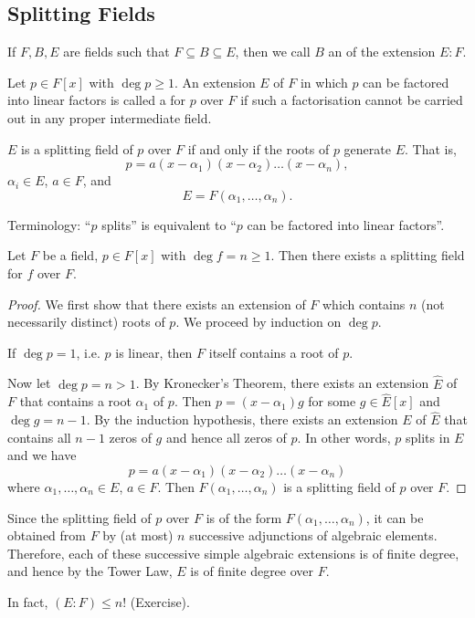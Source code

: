 \subsection{Splitting Fields}
If $F, B, E$ are fields such that $F \subseteq B \subseteq E$, then we call $B$ an  of the extension $E : F$.

\begin{definition}
	Let $p \in F[x]$ with $\deg{p} \geq 1$. An extension $E$ of $F$ in which $p$ can be factored into linear factors is called a  for $p$ over $F$ if such a factorisation cannot be carried out in any proper intermediate field.
\end{definition}

\begin{note}
	$E$ is a splitting field of $p$ over $F$ if and only if the roots of $p$ generate $E$. That is,
	\[
		p = a(x - \alpha_1)(x - \alpha_2)\dots(x - \alpha_n),
	\]
	$\alpha_i \in E$, $a \in F$, and
	\[
		E = F(\alpha_1, \dots, \alpha_n).
	\]
\end{note}

Terminology: ``$p$ splits'' is equivalent to ``$p$ can be factored into linear factors''.

\begin{theorem}\label{thm:9}
	Let $F$ be a field, $p \in F[x]$ with $\deg{f} = n \geq 1$. Then there exists a splitting field for $f$ over $F$.
	\begin{proof}
		We first show that there exists an extension of $F$ which contains $n$ (not necessarily distinct) roots of $p$. We proceed by induction on $\deg{p}$.
		
		If $\deg{p} = 1$, i.e. $p$ is linear, then $F$ itself contains a root of $p$.
		
		Now let $\deg{p} = n > 1$. By Kronecker's Theorem, there exists an extension $\hat{E}$ of $F$ that contains a root $\alpha_1$ of $p$. Then $p = (x - \alpha_1)g$ for some $g \in \hat{E}[x]$ and $\deg{g} = n - 1$. By the induction hypothesis, there exists an extension $E$ of $\hat{E}$ that contains all $n - 1$ zeros of $g$ and hence all zeros of $p$. In other words, $p$ splits in $E$ and we have
		\[
			p = a(x - \alpha_1)(x - \alpha_2)\dots(x - \alpha_n)
		\]
		where $\alpha_1, \dots, \alpha_n \in E$, $a \in F$. Then $F(\alpha_1, \dots, \alpha_n)$ is a splitting field of $p$ over $F$.
	\end{proof}
\end{theorem}

\begin{remark}
	Since the splitting field of $p$ over $F$ is of the form $F(\alpha_1, \dots, \alpha_n)$, it can be obtained from $F$ by (at most) $n$ successive adjunctions of algebraic elements. Therefore, each of these successive simple algebraic extensions is of finite degree, and hence by the Tower Law, $E$ is of finite degree over $F$.
	
	In fact, $(E : F) \leq n!$ (Exercise).
\end{remark}

